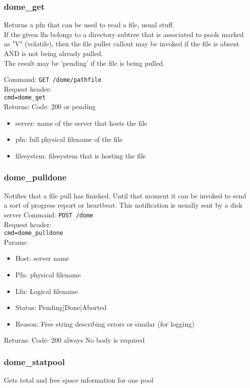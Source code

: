 \documentclass[a4paper,10pt]{scrreprt}
\begin{document}
\subsubsection{dome\_get}
Returns a pfn that can be used to read a file, usual stuff.\\

If the given lfn belongs to a directory subtree that is associated to pools marked as "V" (volatile), then the file puller callout
may be invoked if the file is absent AND is not being already pulled.\\
The result may be 'pending' if the file is being pulled.

Command:
\lstinline"GET /dome/pathfile"\\
Request header:\\
\lstinline"cmd=dome_get"\\


Returns:
Code: 200 or pending
\begin{itemize}
 \item server: name of the server that hosts the file
 \item pfn: full physical filename of the file
 \item filesystem: filesystem that is hosting the file
\end{itemize}

\subsubsection{dome\_pulldone}
Notifies that a file pull has finished. Until that moment it can be invoked to send a sort of progress report or heartbeat.
This notification is usually sent by a disk server
Command:
\lstinline"POST /dome"\\
Request header:\\
\lstinline"cmd=dome_pulldone"\\
Params:
\begin{itemize}
 \item Host: server name
 \item Pfn: physical filename
 \item Lfn: Logical filename
 \item Status: Pending|Done|Aborted
 \item Reason: Free string describing errors or similar (for logging)
\end{itemize}

Returns:
Code: 200 always
No body is required

\subsubsection{dome\_statpool}
Gets total and free space information for one pool
\end{document}
